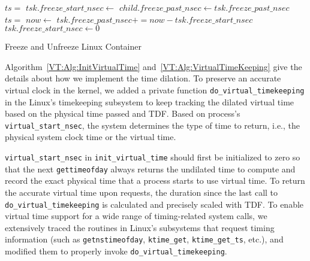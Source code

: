 \begin{algorithm}
    \DontPrintSemicolon
     {
         \;
        $ts = $\GetNS{} \;
        $tsk.freeze\_start\_nsec \gets$  \;
    }
     {
         {
            $child.freeze\_past\_nsec \gets tsk.freeze\_past\_nsec$ \;
             \;
        }
    }
     {
        $ts = $\GetNS{} \;        
        $now \gets$  \;
        $tsk.freeze\_past\_nsec += now - tsk.freeze\_start\_nsec$ \;
        $tsk.freeze\_start\_nsec \gets 0$ \;
         \;
         \;
    }
    \caption{Freeze and Unfreeze Linux Container}
    \label{VT:Alg:Freeze}
\end{algorithm}


Algorithm~\ref{VT:Alg:InitVirtualTime} and~\ref{VT:Alg:VirtualTimeKeeping} give the details about how we implement the time dilation. 
To preserve an accurate virtual clock in the kernel, we added a private function \texttt{do\_virtual\_timekeeping}
in the Linux's timekeeping subsystem to keep tracking the dilated virtual time based on the physical time passed and TDF. 
Based on process's \texttt{virtual\_start\_nsec}, the system determines the type of time to return, i.e., the physical system clock time or the virtual time.

\texttt{virtual\_start\_nsec} in \texttt{init\_virtual\_time} should first be initialized to zero so that the next \texttt{gettimeofday}
always returns the undilated time to compute and record the exact physical time that a process starts to use virtual time.
To return the accurate virtual time upon requests, the duration since the last call to \texttt{do\_virtual\_timekeeping} is calculated and precisely scaled with TDF. 
To enable virtual time support for a wide range of timing-related system calls,
we extensively traced the routines in Linux's subsystems that request timing information (such as \texttt{getnstimeofday},
\texttt{ktime\_get}, \texttt{ktime\_get\_ts}, etc.), and modified them to properly invoke \texttt{do\_virtual\_timekeeping}.

